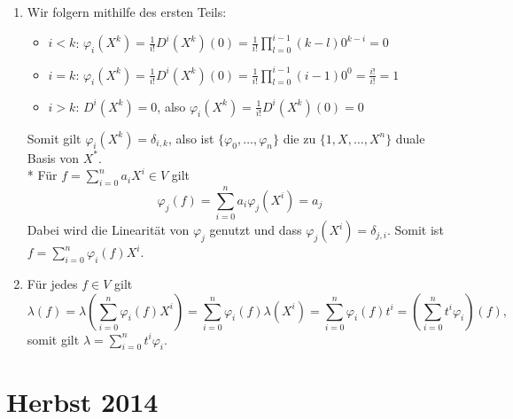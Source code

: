 \begin{enumerate}
	 \item Wir folgern mithilfe des ersten Teils:
	 \begin{itemize}
	 	\item \( i < k \): \quad \( \varphi_i(X^k) = \tfrac{1}{i!}D^i(X^k)(0) = \tfrac{1}{i!}\prod_{l=0}^{i-1}(k-l)0^{k-i} = 0 \) 
	 	\item \( i=k \): \quad \( \varphi_i(X^k) = \tfrac{1}{i!}D^i(X^k)(0) = \tfrac{1}{i!}\prod_{l=0}^{i-1}(i-1)0^0 = \tfrac{i!}{i!} = 1 \)
	 	\item \( i > k \): \quad \( D^i(X^k) = 0 \), also \( \varphi_i(X^k) = \tfrac{1}{i!}D^i(X^k)(0) = 0 \)
	 \end{itemize}
	 Somit gilt \( \varphi_i(X^k) = \delta_{i,k} \), also ist \( \{ \varphi_0, \dots, \varphi_n \} \) die zu \( \{ 1, X, \dots, X^n \} \) duale Basis von \( X^\ast \).
	 \\*
	 Für \( f = \sum_{i=0}^n a_iX^i \in V \) gilt
	 \begin{equation*}
	 	\varphi_j(f) = \sum_{i=0}^n a_i\varphi_j(X^i) = a_j
	 \end{equation*}
	 Dabei wird die Linearität von \( \varphi_j \) genutzt und dass \( \varphi_j(X^i) = \delta_{j,i} \). Somit ist \( f = \sum_{i=0}^n \varphi_i(f)X^i \).

	 \item Für jedes \( f \in V \) gilt
	 \begin{equation*}
	 	\lambda(f) = \lambda\left( \sum_{i=0}^n\varphi_i(f)X^i \right) = \sum_{i=0}^n\varphi_i(f)\lambda(X^i) = \sum_{i=0}^n\varphi_i(f)t^i = \left( \sum_{i=0}^nt^i\varphi_i \right)(f)\text{,}
	 \end{equation*}
	 somit gilt \( \lambda = \sum_{i=0}^nt^i\varphi_i \).
\end{enumerate}


\section{Herbst 2014}

